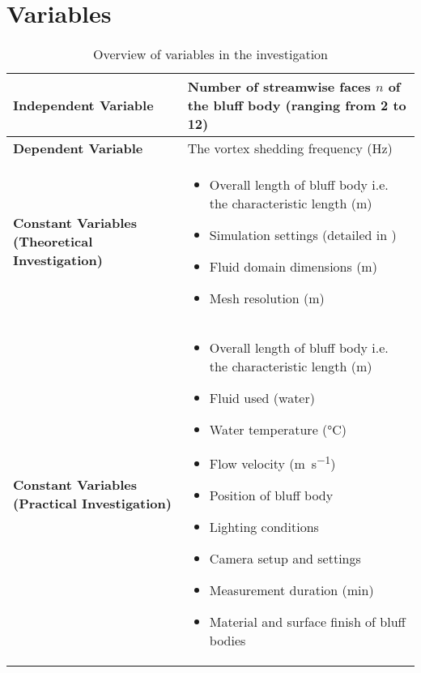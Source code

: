 \section{Variables}

\begin{table}[H]
	\centering
	\renewcommand{\arraystretch}{1.3}
	\begin{tabularx}{\textwidth}{|>{\raggedright\arraybackslash}p{5.2cm}|X|}
		\hline
		\textbf{Independent Variable} & Number of streamwise faces $n$ of the bluff body (ranging from 2 to 12) \\
		\hline
		\textbf{Dependent Variable} & The vortex shedding frequency (\si{\hertz}) \\
		\hline
		\textbf{Constant Variables (Theoretical Investigation)} &
		\begin{itemize}[leftmargin=1.5em, itemsep=2pt, topsep=0pt, label=--]
			\item Overall length of bluff body i.e. the characteristic length (\si{\meter})
			\item Simulation settings (detailed in \Cref{sec:simulationSettings})
			\item Fluid domain dimensions (\si{\meter})
			\item Mesh resolution (\si{\meter})
		\end{itemize} \\
		\hline
		\textbf{Constant Variables (Practical Investigation)} &
		\begin{itemize}[leftmargin=1.5em, itemsep=2pt, topsep=0pt, label=--]
			\item Overall length of bluff body i.e. the characteristic length (\si{\meter})
			\item Fluid used (water)
			\item Water temperature (\si{\celsius})
			\item Flow velocity (\si{\meter\per\second})
			\item Position of bluff body
			\item Lighting conditions
			\item Camera setup and settings
			\item Measurement duration (\si{\minute})
			\item Material and surface finish of bluff bodies
		\end{itemize} \\
		\hline
	\end{tabularx}
	\caption{Overview of variables in the investigation}
	\label{tab:variables}
\end{table}

